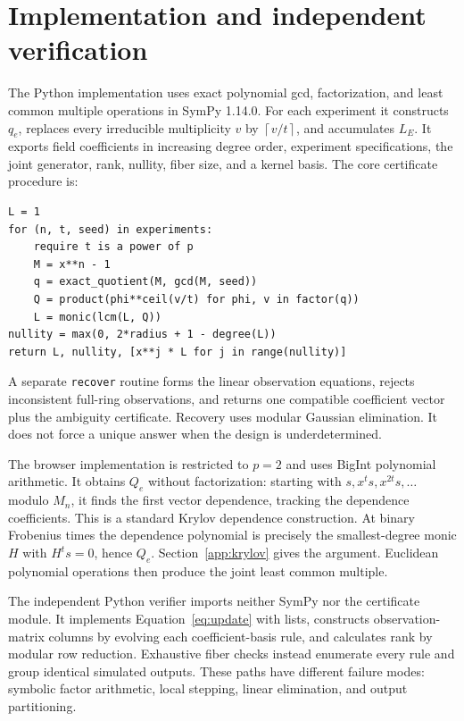 \documentclass[11pt]{article}
\newcommand{\ceil}[1]{\left\lceil #1\right\rceil}
\begin{document}
\section{Implementation and independent verification}
The Python implementation uses exact polynomial gcd, factorization, and least common multiple operations in SymPy 1.14.0. For each experiment it constructs $q_e$, replaces every irreducible multiplicity $v$ by $\ceil{v/t}$, and accumulates $L_E$. It exports field coefficients in increasing degree order, experiment specifications, the joint generator, rank, nullity, fiber size, and a kernel basis. The core certificate procedure is:
\begin{lstlisting}[caption={Certificate construction; all polynomial operations are over the declared prime field.}]
L = 1
for (n, t, seed) in experiments:
    require t is a power of p
    M = x**n - 1
    q = exact_quotient(M, gcd(M, seed))
    Q = product(phi**ceil(v/t) for phi, v in factor(q))
    L = monic(lcm(L, Q))
nullity = max(0, 2*radius + 1 - degree(L))
return L, nullity, [x**j * L for j in range(nullity)]
\end{lstlisting}

A separate \texttt{recover} routine forms the linear observation equations, rejects inconsistent full-ring observations, and returns one compatible coefficient vector plus the ambiguity certificate. Recovery uses modular Gaussian elimination. It does not force a unique answer when the design is underdetermined.

The browser implementation is restricted to $p=2$ and uses BigInt polynomial arithmetic. It obtains $Q_e$ without factorization: starting with $s,x^t s,x^{2t}s,\ldots$ modulo $M_n$, it finds the first vector dependence, tracking the dependence coefficients. This is a standard Krylov dependence construction. At binary Frobenius times the dependence polynomial is precisely the smallest-degree monic $H$ with $H^t s=0$, hence $Q_e$. Section~\ref{app:krylov} gives the argument. Euclidean polynomial operations then produce the joint least common multiple.

The independent Python verifier imports neither SymPy nor the certificate module. It implements Equation~\eqref{eq:update} with lists, constructs observation-matrix columns by evolving each coefficient-basis rule, and calculates rank by modular row reduction. Exhaustive fiber checks instead enumerate every rule and group identical simulated outputs. These paths have different failure modes: symbolic factor arithmetic, local stepping, linear elimination, and output partitioning.
\end{document}
